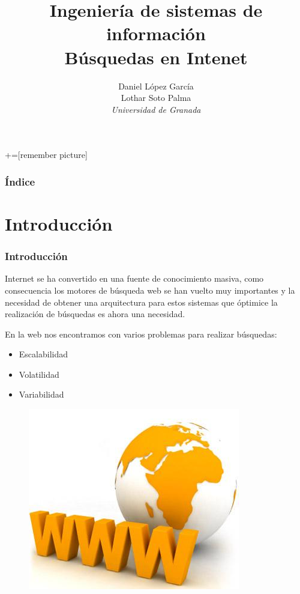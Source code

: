 \documentclass[9pt]{beamer} %
\author[Universidad de Granada]{Daniel López García\\ Lothar Soto Palma\\\textit{Universidad de Granada}}
\title{Ingeniería de sistemas de información\\ Búsquedas en Intenet}
\begin{document}
+=[remember picture]

\everymath{\displaystyle}

\begin{frame}
\titlepage
\end{frame}

\begin{frame}
\frametitle{Índice}
\tableofcontents
\end{frame}
	\section{Introducción}
\begin{frame}

	\frametitle{Introducción}
	Internet se ha convertido en una fuente de conocimiento masiva, como consecuencia los motores de búsqueda web se han vuelto muy importantes y la necesidad de obtener una arquitectura para estos sistemas que óptimice la realización de búsquedas es ahora una necesidad.

	\medskip
	En la web nos encontramos con varios problemas para realizar búsquedas:
		\begin{itemize}
			\item Escalabilidad
			\item Volatilidad
			\item Variabilidad
		\end{itemize}
		\begin{figure}[H]
			\centering
			\includegraphics[scale=0.3]{./img/WWW}
		\end{figure}
\end{frame}
\end{document}
